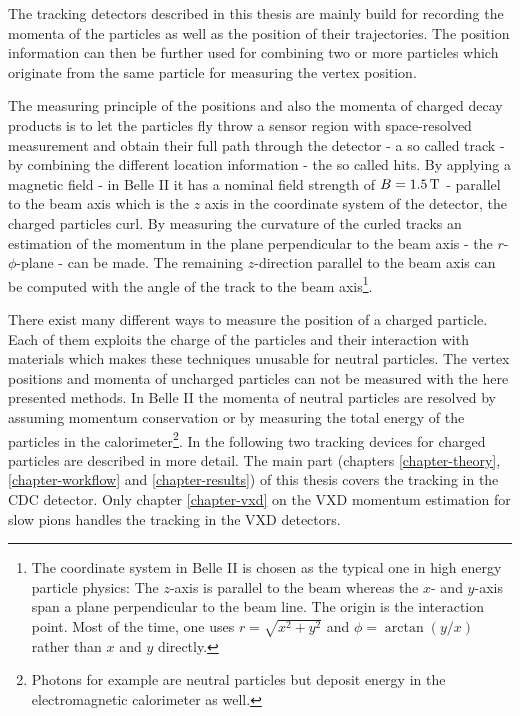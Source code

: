The tracking detectors described in this thesis are mainly build for recording the momenta of the particles as well as the position of their trajectories. The position information can then be further used for combining two or more particles which originate from the same particle for measuring the vertex position. %

The measuring principle of the positions and also the momenta of charged decay products is to let the particles fly throw a sensor region with space-resolved measurement and obtain their full path through the detector - a so called track - by combining the different location information - the so called hits. By applying a magnetic field - in Belle II it has a nominal field strength of $B = \unit[1.5]{T}$ - parallel to the beam axis which is the $z$ axis in the coordinate system of the detector, the charged particles curl. By measuring the curvature of the curled tracks an estimation of the momentum in the plane perpendicular to the beam axis - the $r$-$\phi$-plane - can be made. The remaining $z$-direction parallel to the beam axis can be computed with the angle of the track to the beam axis\footnote{The coordinate system in Belle II is chosen as the typical one in high energy particle physics\cite{coordinate}: The $z$-axis is parallel to the beam whereas the $x$- and $y$-axis span a plane perpendicular to the beam line. The origin is the interaction point. Most of the time, one uses $r = \sqrt{x^2 + y^2}$ and $\phi = \arctan(y/x)$ rather than $x$ and $y$ directly.}.

There exist many different ways to measure the position of a charged particle. Each of them exploits the charge of the particles and their interaction with materials which makes these techniques unusable for neutral particles. The vertex positions and momenta of uncharged particles can not be measured with the here presented methods. In Belle II the momenta of neutral particles are resolved by assuming momentum conservation or by measuring the total energy of the particles in the calorimeter\footnote{Photons for example are neutral particles but deposit energy in the electromagnetic calorimeter as well.}. In the following two tracking devices for charged particles are described in more detail. The main part (chapters \ref{chapter-theory}, \ref{chapter-workflow} and \ref{chapter-results}) of this thesis covers the tracking in the CDC detector. Only chapter \ref{chapter-vxd} on the VXD momentum estimation for slow pions handles the tracking in the VXD detectors.

